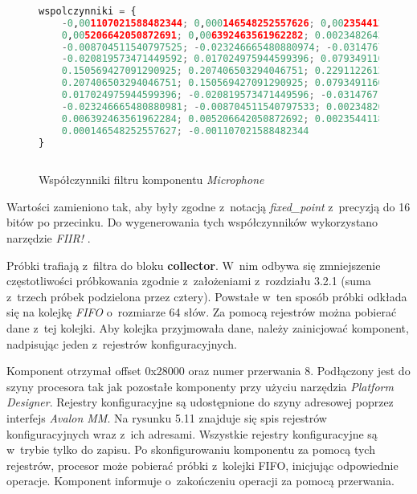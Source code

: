 \begin{figure}[h]
\begin{lstlisting}[language=Python]
	
wspolczynniki = {
	-0,001107021588482344; 0,000146548252557626; 0,002354411824246723; 
	0,005206642050872691; 0,006392463561962282; 0.002348264305160368;
	-0.008704511540797525; -0.023246665480880974; -0.031476710933373515; 
	-0.020819573471449592; 0.017024975944599396; 0.079349116069050263;
	0.150569427091290925; 0.207406503294046751; 0.229112261242394033; 
	0.207406503294046751; 0.150569427091290925; 0.079349116069050277;
	0.017024975944599396; -0.020819573471449596; -0.031476710933373515; 
	-0.023246665480880981; -0.008704511540797533; 0.002348264305160369;
	0.006392463561962284; 0.005206642050872692; 0.002354411824246721;
	0.000146548252557627; -0.001107021588482344
}
	
\end{lstlisting}
\caption{Współczynniki filtru komponentu \textit{Microphone}}
\end{figure}
\FloatBarrier %
Wartości zamieniono tak, aby były zgodne z~notacją \textit{fixed\_point} z~precyzją do 16 bitów po przecinku. Do wygenerowania tych współczynników wykorzystano narzędzie \textit{FIIR!} \cite{FIRDesign}.

Próbki trafiają z~filtra do bloku \textbf{collector}. W~nim odbywa się zmniejszenie częstotliwości próbkowania zgodnie z~założeniami z~rozdziału 3.2.1 (suma z~trzech próbek podzielona przez cztery). Powstałe w~ten sposób próbki odkłada się na kolejkę \textit{FIFO} o~rozmiarze 64 słów. Za pomocą rejestrów można pobierać dane z~tej kolejki. Aby kolejka przyjmowała dane, należy zainicjować komponent, nadpisując jeden z~rejestrów konfiguracyjnych.

Komponent otrzymał offset 0x28000 oraz numer przerwania 8. Podłączony jest do szyny procesora tak jak pozostałe komponenty przy użyciu narzędzia \textit{Platform Designer}. Rejestry konfiguracyjne są udostępnione do szyny adresowej poprzez interfejs \textit{Avalon MM}. Na rysunku 5.11 znajduje się spis rejestrów konfiguracyjnych wraz z~ich adresami. Wszystkie rejestry konfiguracyjne są w~trybie tylko do zapisu. Po skonfigurowaniu komponentu za pomocą tych rejestrów, procesor może pobierać próbki z~kolejki FIFO, inicjując odpowiednie operacje. Komponent informuje o~zakończeniu operacji za pomocą przerwania.



